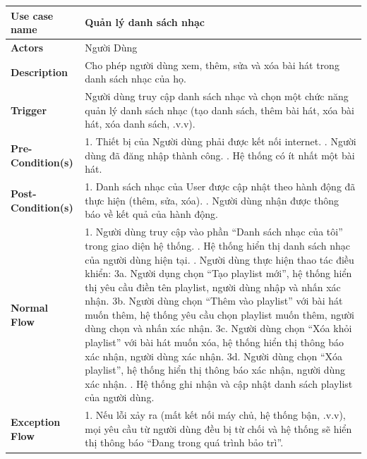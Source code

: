 \documentclass[a4paper]{article}
\newcommand{\cach}{\hspace*{1.5em}\ignorespaces}
\begin{document}
\begin{table}[h!]
\centering
\renewcommand{\arraystretch}{1.3} %
\begin{tabularx}{\textwidth}{|l|X|}
\hline
\textbf{Use case name} & Quản lý danh sách nhạc \\ \hline
\textbf{Actors}        & Người Dùng \\ \hline
\textbf{Description}   & Cho phép người dùng xem, thêm, sửa và xóa bài hát trong danh sách nhạc của họ. \\ \hline
\textbf{Trigger}       & Người dùng truy cập danh sách nhạc và chọn một chức năng quản lý danh sách nhạc (tạo danh sách, thêm bài hát, xóa bài hát, xóa danh sách, .v.v). \\ \hline
\textbf{Pre-Condition(s)} 
& 1. Thiết bị của Người dùng phải được kết nối internet. \newline
  2. Người dùng đã đăng nhập thành công. \newline
  3. Hệ thống có ít nhất một bài hát. \\ \hline
\textbf{Post-Condition(s)} 
& 1. Danh sách nhạc của User được cập nhật theo hành động đã thực hiện (thêm, sửa, xóa). \newline
  2. Người dùng nhận được thông báo về kết quả của hành động. \\ \hline
\textbf{Normal Flow}   
& 1. Người dùng truy cập vào phần “Danh sách nhạc của tôi” trong giao diện hệ thống. \newline
  2. Hệ thống hiển thị danh sách nhạc của người dùng hiện tại. \newline
  3. Người dùng thực hiện thao tác điều khiển: \newline
  \cach 3a. Người dụng chọn ``Tạo playlist mới'', hệ thống hiển thị yêu cầu điền tên playlist, người dùng nhập và nhấn xác nhận. \newline
  \cach 3b. Người dùng chọn ``Thêm vào playlist'' với bài hát muốn thêm, hệ thống yêu cầu chọn playlist muốn thêm, người dùng chọn và nhấn xác nhận. \newline
  \cach 3c. Người dùng chọn ``Xóa khỏi playlist'' với bài hát muốn xóa, hệ thống hiển thị thông báo xác nhận, người dùng xác nhận. \newline
  \cach 3d. Người dùng chọn ``Xóa playlist'', hệ thống hiển thị thông báo xác nhận, người dùng xác nhận. \newline
  4. Hệ thống ghi nhận và cập nhật danh sách playlist của người dùng. \\ \hline
\textbf{Exception Flow} 
& 1. Nếu lỗi xảy ra (mất kết nối máy chủ, hệ thống bận, .v.v), mọi yêu cầu từ người dùng đều bị từ chối và hệ thống sẽ hiển thị thông báo ``Đang trong quá trình bảo trì''. \newline

\end{tabularx}
\end{table}
\end{document}
